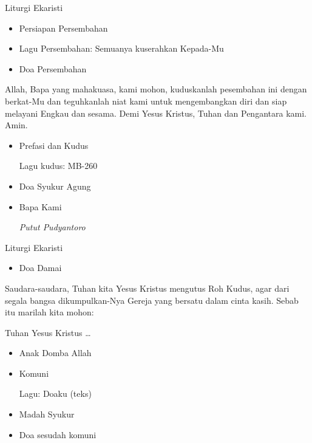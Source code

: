 \documentclass[12pt,a4paper]{beamer}
\begin{document}
\begin{frame}{Liturgi Ekaristi}
\begin{itemize}
\item Persiapan Persembahan
\item Lagu Persembahan: Semuanya kuserahkan Kepada-Mu
\item Doa Persembahan
\end{itemize}

\begin{description}[1cm]
\item [I] Allah, Bapa yang mahakuasa, kami mohon, kuduskanlah pesembahan ini dengan berkat-Mu dan teguhkanlah niat kami untuk mengembangkan diri dan siap melayani Engkau dan sesama. Demi Yesus Kristus, Tuhan dan Pengantara kami. Amin.
\end{description}

\begin{itemize}
\item Prefasi dan Kudus

Lagu kudus: MB-260

\item Doa Syukur Agung
\item Bapa Kami 

	\textit{Putut Pudyantoro}
\end{itemize}
\end{frame}

\begin{frame}{Liturgi Ekaristi}
\begin{itemize}
\item Doa Damai
\end{itemize}
\begin{description}[1cm]
\item [I] 	Saudara-saudara, Tuhan kita Yesus Kristus mengutus Roh Kudus, agar dari segala bangsa dikumpulkan-Nya Gereja yang bersatu dalam cinta kasih. Sebab itu marilah kita mohon:
\item [U] 	Tuhan Yesus Kristus \ldots
\end{description}

\begin{itemize}
\item Anak Domba Allah
\item Komuni

	Lagu: Doaku (teks)
\item Madah Syukur
\item Doa sesudah komuni
\end{itemize}
\end{frame}
\end{document}
